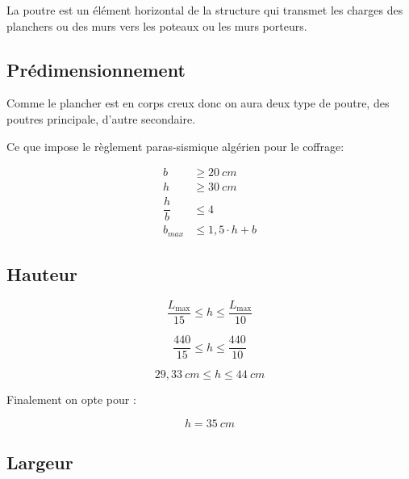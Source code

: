 \documentclass[12pt,a4paper]{report}
\numberwithin{equation}{section}
\begin{document}
	La poutre est un élément horizontal de la structure qui transmet les charges des planchers
	ou des murs vers les poteaux ou les murs porteurs.
	
	\subsection{Prédimensionnement}
	
	Comme le plancher est en corps creux donc on aura deux type de poutre, des poutres principale, d'autre secondaire.
	
	\vspace{\baselineskip}
	
	Ce que impose le règlement paras-sismique algérien pour le coffrage\footnotemark[2] : 
	
	\begin{equation}
		\begin{aligned}
			b& \geq 20 ~\unit{cm} \\
			h& \geq 30 ~\unit{cm} \\
			\dfrac{h}{b}& \leq 4 \\
			b_{max}& \leq 1,5\cdot h + b
		\end{aligned}
		\label{dtr:coffrage-poutre}
	\end{equation}
	
	
	\vspace{\baselineskip}
	
	\subsection{Hauteur}
	
	\begin{equation}
		\dfrac{L_{\max}}{15} \leq h \leq \dfrac{L_{\max}}{10}
	\end{equation}
	
	
	
	
	
	\[ \dfrac{440}{15} \leq h \leq \dfrac{440}{10} \]
	
	\[ 29,33 ~\unit{cm} \leq h \leq 44 ~\unit{cm} \]
	
	Finalement on opte pour :
	
	\[ h = 35 ~\unit{cm} \]
	
	\subsection{Largeur}
	
\end{document}
